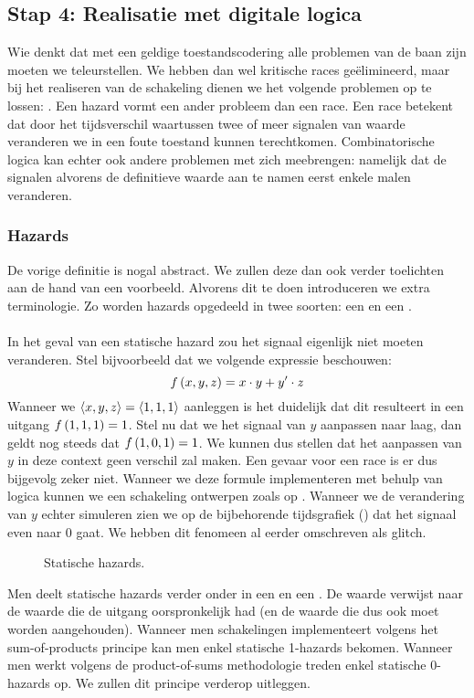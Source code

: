 \subsection{Stap 4: Realisatie met digitale logica}
Wie denkt dat met een geldige toestandscodering alle problemen van de baan zijn moeten we teleurstellen. We hebben dan wel kritische races ge\"elimineerd, maar bij het realiseren van de schakeling dienen we het volgende problemen op te lossen: . Een hazard vormt een ander probleem dan een race. Een race betekent dat door het tijdsverschil waartussen twee of meer signalen van waarde veranderen we in een foute toestand kunnen terechtkomen. Combinatorische logica kan echter ook andere problemen met zich meebrengen: namelijk dat de signalen alvorens de definitieve waarde aan te namen eerst enkele malen veranderen.
\subsubsection{Hazards}
De vorige definitie is nogal abstract. We zullen deze dan ook verder toelichten aan de hand van een voorbeeld. Alvorens dit te doen introduceren we extra terminologie. Zo worden hazards opgedeeld in twee soorten: een  en een .
\paragraph{}
In het geval van een statische hazard zou het signaal eigenlijk niet moeten veranderen. Stel bijvoorbeeld dat we volgende expressie beschouwen:
\begin{equation}
f\left( x,y,z \right)=x\cdot y+y'\cdot z
\end{equation}
Wanneer we $\left\langle x,y,z \right\rangle=\left\langle 1,1,1 \right\rangle$ aanleggen is het duidelijk dat dit resulteert in een uitgang $f\left( 1,1,1 \right)=1$. Stel nu dat we het signaal van $y$ aanpassen naar laag, dan geldt nog steeds dat $f\left( 1,0,1 \right)=1$. We kunnen dus stellen dat het aanpassen van $y$ in deze context geen verschil zal maken. Een gevaar voor een race is er dus bijgevolg zeker niet. Wanneer we deze formule implementeren met behulp van logica kunnen we een schakeling ontwerpen zoals op . Wanneer we de verandering van $y$ echter simuleren zien we op de bijbehorende tijdsgrafiek () dat het signaal even naar $0$ gaat. We hebben dit fenomeen al eerder omschreven als glitch.
\begin{figure}[hbt]
\centering
{}
\caption{Statische hazards.}
\end{figure}
Men deelt statische hazards verder onder in een  en een . De waarde verwijst naar de waarde die de uitgang oorspronkelijk had (en de waarde die dus ook moet worden aangehouden). Wanneer men schakelingen implementeert volgens het sum-of-products principe kan men enkel statische 1-hazards bekomen. Wanneer men werkt volgens de product-of-sums methodologie treden enkel statische 0-hazards op. We zullen dit principe verderop uitleggen.
